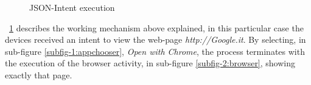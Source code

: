 \begin{figure}[h]
	\centering
	\begin{minipage}{.49\textwidth}\centering
	\end{minipage}
	\begin{minipage}{.49\textwidth}\centering
	\end{minipage}
	\caption{JSON-Intent execution}
	\label{fig:5.4}
\end{figure}
\figurename~\ref{fig:5.4} describes the working mechanism above explained, in this particular case the devices received an intent to view the web-page \textit{http://Google.it}. By selecting, in sub-figure \ref{subfig-1:appchooser}, \textit{Open with Chrome}, the process terminates with the execution of the browser activity, in sub-figure \ref{subfig-2:browser}, showing exactly that page.

